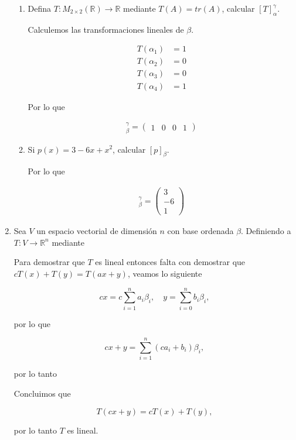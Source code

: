 \documentclass[10pt,a4paper]{article}
\theoremstyle{definition}
\newcommand{\R}{\mathbb{R}}
\begin{document}
\begin{enumerate}
\begin{enumerate}
        \item Defina $T: M_{2\times 2}(\R) \rightarrow \R$ mediante $T(A) = tr(A)$, calcular $[T]^\gamma_\alpha$.
        
        Calculemos las transformaciones lineales de $\beta$.

        \begin{align*}
            T(\alpha_1) &= 1\\
            T(\alpha_2) &= 0\\
            T(\alpha_3) &= 0\\
            T(\alpha_4) &= 1
        \end{align*}
        
        Por lo que

        \begin{align*}
            [T]^\gamma_\beta = \begin{pmatrix}
                1 & 0 & 0 & 1
            \end{pmatrix}
        \end{align*}

        \item Si $p(x) = 3 - 6x + x^2$, calcular $[p]_\beta$.
        
        Por lo que

        \begin{align*}
            [T]^\gamma_\beta = \begin{pmatrix}
                3 \\ -6 \\ 1
            \end{pmatrix}
        \end{align*}

    \end{enumerate}

    \item Sea $V$ un espacio vectorial de dimensión $n$ con base ordenada $\beta$. Definiendo a $T : V \rightarrow \R^n$ mediante %
    
    Para demostrar que $T$ es lineal entonces falta con demostrar que $cT(x) + T(y) = T(ax + y)$, veamos lo siguiente

    \[cx = c\sum_{i=1}^{n}a_i\beta_i, \quad y = \sum_{i=0}^{n}b_i\beta_i,\]

    por lo que

    \[cx + y = \sum_{i=1}^{n}(ca_i + b_i)\beta_i,\]

    por lo tanto


    Concluimos que

    \[T(cx + y) = cT(x) + T(y),\]

    por lo tanto $T$ es lineal.
    
\end{enumerate}
\end{document}
